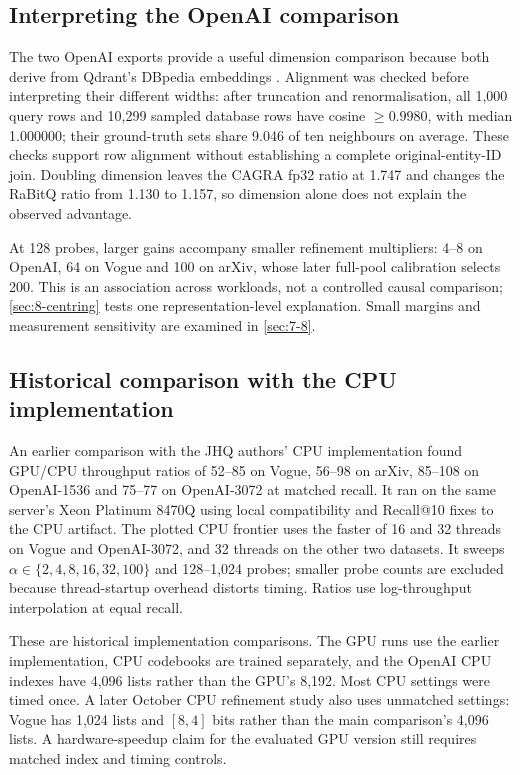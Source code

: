 

\subsection{Interpreting the OpenAI comparison}

The two OpenAI exports provide a useful dimension comparison because
both derive from Qdrant's DBpedia embeddings
\cite{data_openai1536,data_openai3072}. Alignment was checked before
interpreting their different widths: after truncation and
renormalisation, all 1,000 query rows and 10,299 sampled database rows
have cosine $\geq0.9980$, with median 1.000000; their ground-truth sets
share 9.046 of ten neighbours on average. These checks support row
alignment without establishing a complete original-entity-ID join.
Doubling dimension leaves the CAGRA fp32 ratio at 1.747 and changes the
RaBitQ ratio from 1.130 to 1.157, so dimension alone does not explain
the observed advantage.

At 128 probes, larger gains accompany smaller refinement multipliers:
4--8 on OpenAI, 64 on Vogue and 100 on arXiv, whose later full-pool
calibration selects 200. This is an association across workloads,
not a controlled causal comparison; \cref{sec:8-centring} tests one
representation-level explanation. Small margins and measurement
sensitivity are examined in \cref{sec:7-8}.



\subsection{Historical comparison with the CPU implementation}
\label{sec:7-cpu}

An earlier comparison with the JHQ authors' CPU implementation found
GPU/CPU throughput ratios of 52--85 on Vogue, 56--98 on arXiv,
85--108 on OpenAI-1536 and 75--77 on OpenAI-3072 at matched recall.
It ran on the same server's Xeon Platinum 8470Q using local compatibility
and Recall@10 fixes to the CPU artifact. The plotted CPU frontier uses
the faster of 16 and 32 threads on Vogue and OpenAI-3072, and 32 threads
on the other two datasets. It sweeps
$\alpha\in\{2,4,8,16,32,100\}$ and 128--1,024 probes; smaller probe
counts are excluded because thread-startup overhead distorts timing.
Ratios use log-throughput interpolation at equal recall.

These are historical implementation comparisons. The GPU runs use the earlier implementation,
CPU codebooks are trained separately, and the OpenAI CPU indexes have
4,096 lists rather than the GPU's 8,192. Most CPU settings were timed
once. A later October CPU refinement study also uses unmatched settings:
Vogue has 1,024 lists and $[8,4]$ bits rather than the main comparison's
4,096 lists. A hardware-speedup claim for the evaluated GPU version
still requires matched index and timing controls.


